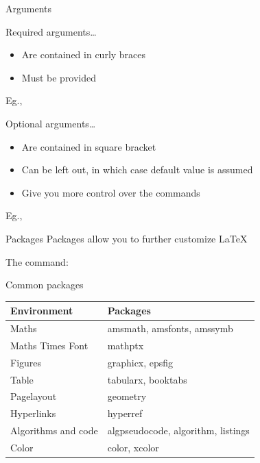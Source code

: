 \documentclass[10pt,times]{beamer}
\begin{document}
\begin{frame}{Arguments}
\begin{block}{Required arguments\ldots}
\begin{itemize}
\item Are contained in curly braces
\item Must be provided
\end{itemize}
Eg., 
\end{block}

\begin{block}{Optional arguments\ldots}
\begin{itemize}
\item Are contained in square bracket
\item Can be left out, in which case default value is assumed
\item Give you more control over the commands
\end{itemize}
Eg., 
\end{block}
\end{frame}


\begin{frame}{Packages}
Packages allow you to further customize \LaTeX
\begin{block}{The command:}
\end{block}

\begin{block}{Common packages}
\begin{tabularx}{0.95\textwidth}{lX}
\toprule
Environment & Packages \\ \midrule
Maths & amsmath, amsfonts, amssymb \\ 
Maths Times Font & {mathptx} \\
Figures & graphicx, epsfig \\
Table & tabularx, booktabs \\
Pagelayout & geometry \\
Hyperlinks & hyperref \\
Algorithms and code & algpseudocode, algorithm, listings \\
Color & color, xcolor \\
\bottomrule
\end{tabularx}
\end{block}
\end{frame}
\end{document}
